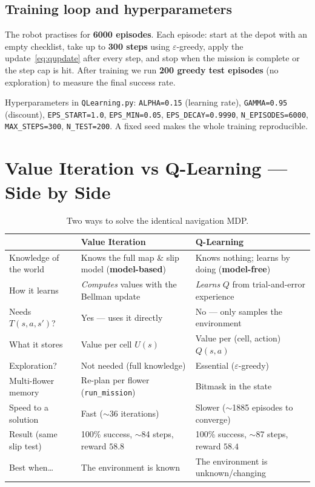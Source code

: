 \documentclass[11pt]{article}
\begin{document}
\subsection{Training loop and hyperparameters}
The robot practises for \textbf{6000 episodes}. Each episode: start at the depot
with an empty checklist, take up to \textbf{300 steps} using $\varepsilon$-greedy,
apply the update~\eqref{eq:qupdate} after every step, and stop when the mission
is complete or the step cap is hit. After training we run \textbf{200 greedy test
episodes} (no exploration) to measure the final success rate.

\begin{codebox}
Hyperparameters in \texttt{QLearning.py}: \texttt{ALPHA=0.15} (learning rate),
\texttt{GAMMA=0.95} (discount), \texttt{EPS\_START=1.0}, \texttt{EPS\_MIN=0.05},
\texttt{EPS\_DECAY=0.9990}, \texttt{N\_EPISODES=6000}, \texttt{MAX\_STEPS=300},
\texttt{N\_TEST=200}. A fixed seed makes the whole training reproducible.
\end{codebox}

\section{Value Iteration vs Q-Learning --- Side by Side}

\begin{table}[h]
\centering
\renewcommand{\arraystretch}{1.3}
\begin{tabular}{@{}p{3.4cm} p{5.0cm} p{5.0cm}@{}}
\toprule
& \textbf{Value Iteration} & \textbf{Q-Learning} \\
\midrule
Knowledge of the world & Knows the full map \& slip model (\textbf{model-based}) & Knows nothing; learns by doing (\textbf{model-free}) \\
How it learns & \emph{Computes} values with the Bellman update & \emph{Learns} $Q$ from trial-and-error experience \\
Needs $T(s,a,s')$? & Yes --- uses it directly & No --- only samples the environment \\
What it stores & Value per cell $U(s)$ & Value per (cell, action) $Q(s,a)$ \\
Exploration? & Not needed (full knowledge) & Essential ($\varepsilon$-greedy) \\
Multi-flower memory & Re-plan per flower (\texttt{run\_mission}) & Bitmask in the state \\
Speed to a solution & Fast ($\sim$36 iterations) & Slower ($\sim$1885 episodes to converge) \\
Result (same slip test) & 100\% success, $\sim$84 steps, reward $58.8$ & 100\% success, $\sim$87 steps, reward $58.4$ \\
Best when\dots & The environment is known & The environment is unknown/changing \\
\bottomrule
\end{tabular}
\caption{Two ways to solve the identical navigation MDP.}
\end{table}
\end{document}
